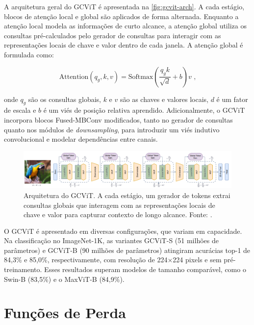 A arquitetura geral do GCViT é apresentada na \autoref{fig:gcvit-arch}. A cada estágio, blocos de atenção local e global são aplicados de forma alternada. Enquanto a atenção local modela as informações de curto alcance, a atenção global utiliza os consultas pré-calculados pelo gerador de consultas para interagir com as representações locais de chave e valor dentro de cada janela. A atenção global é formulada como:

\begin{equation}
    \text{Attention}(q_g, k, v) = \text{Softmax}\left(\frac{q_g k}{\sqrt{d}} + b\right)v \text{ ,}
\end{equation}

onde $q_g$ são os consultas globais, $k$ e $v$ são as chaves e valores locais, $d$ é um fator de escala e $b$ é um viés de posição relativa aprendido. Adicionalmente, o GCViT incorpora blocos Fused-MBConv modificados, tanto no gerador de consultas quanto nos módulos de \textit{downsampling}, para introduzir um viés indutivo convolucional e modelar dependências entre canais.

\begin{figure}[!htbp]
    \centering
    \includegraphics[width=\linewidth]{figs/gcvit-arch.png}
    \caption{Arquitetura do GCViT. A cada estágio, um gerador de tokens extrai consultas globais que interagem com as representações locais de chave e valor para capturar contexto de longo alcance. Fonte: .}
    \label{fig:gcvit-arch}
\end{figure}

O GCViT é apresentado em diversas configurações, que variam em capacidade. Na classificação no ImageNet-1K, as variantes GCViT-S (51 milhões de parâmetros) e GCViT-B (90 milhões de parâmetros) atingiram acurácias top-1 de 84,3\% e 85,0\%, respectivamente, com resolução de 224×224 pixels e sem pré-treinamento. Esses resultados superam modelos de tamanho comparável, como o Swin-B (83,5\%) e o MaxViT-B (84,9\%).

\section{Funções de Perda} \label{sec:funcoes-perda}

